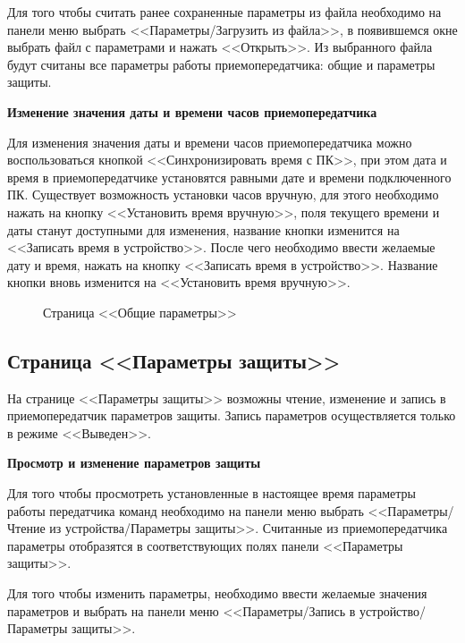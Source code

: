 Для того чтобы считать ранее сохраненные параметры из файла необходимо на панели меню выбрать <<Параметры/Загрузить из файла>>, в появившемся окне выбрать файл с параметрами и нажать <<Открыть>>. Из выбранного файла будут считаны все параметры работы приемопередатчика: общие и параметры защиты. 
\newline

\textbf{Изменение значения даты и времени часов приемопередатчика}

Для изменения значения даты и времени часов приемопередатчика можно воспользоваться кнопкой <<Синхронизировать время с ПК>>, при этом дата и время в приемопередатчике установятся равными дате и времени подключенного ПК. Существует возможность установки часов вручную, для этого необходимо нажать на кнопку <<Установить время вручную>>, поля текущего времени и даты станут доступными для изменения, название кнопки изменится на <<Записать время в устройство>>. После чего необходимо ввести желаемые дату и время, нажать на кнопку <<Записать время в устройство>>. Название кнопки вновь изменится на <<Установить время вручную>>. 

\begin{figure}[H]
	
	\caption{Страница <<Общие параметры>>}
	\label{fig:configurator_param_glb}
\end{figure}


\subsection{Страница <<Параметры защиты>>}	\label{ssec:configurator_param_def}

На странице <<Параметры защиты>> возможны чтение, изменение и запись в приемопередатчик параметров защиты. Запись параметров осуществляется только в режиме <<Выведен>>.
\newline 

\textbf{Просмотр и изменение параметров защиты}

Для того чтобы просмотреть установленные в настоящее время параметры работы передатчика команд необходимо на панели меню выбрать <<Параметры/Чтение из устройства/Параметры защиты>>. Считанные из приемопередатчика параметры отобразятся в соответствующих полях панели <<Параметры защиты>>.

Для того чтобы изменить параметры, необходимо ввести желаемые значения параметров и выбрать на панели меню <<Параметры/Запись в устройство/Параметры защиты>>. 
\newline 

